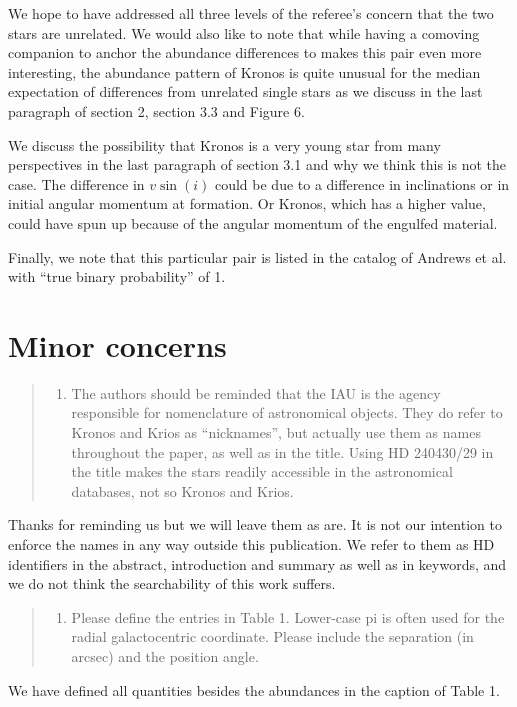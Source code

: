 \documentclass[12pt]{article}
\begin{document}
We hope to have addressed all three levels of the referee's concern that the two
stars are unrelated.
We would also like to note that while having a comoving companion to anchor the
abundance differences to makes this pair even more interesting, the abundance
pattern of Kronos is quite unusual for the median expectation of differences
from unrelated single stars as we discuss in the last paragraph of section 2,
section 3.3 and Figure 6.

We discuss the possibility that Kronos is a very young star from many
perspectives in the last paragraph of section 3.1 and why we think this is not
the case.
The difference in $v\sin(i)$ could be due to a difference in inclinations or 
in initial angular momentum at formation. Or Kronos, which has a higher value,
could have spun up because of the angular momentum of the engulfed material.

Finally, we note that this particular pair is listed in the catalog of Andrews et al.
with ``true binary probability'' of 1.


\section*{Minor concerns}\label{minor-concerns}

\begin{quote}
\begin{enumerate}
\def\labelenumi{\arabic{enumi}.}
\itemsep1pt\parskip0pt
\item
  The authors should be reminded that the IAU is the agency responsible
  for nomenclature of astronomical objects. They do refer to Kronos and
  Krios as ``nicknames'', but actually use them as names throughout the
  paper, as well as in the title. Using HD 240430/29 in the title makes
  the stars readily accessible in the astronomical databases, not so
  Kronos and Krios.
\end{enumerate}
\end{quote}
Thanks for reminding us but we will leave them as are. It is not our intention
to enforce the names in any way outside this publication. We refer to them as HD
identifiers in the abstract, introduction and summary as well as in keywords,
and we do not think the searchability of this work suffers.

\begin{quote}
\begin{enumerate}
\def\labelenumi{\arabic{enumi}.}
\setcounter{enumi}{1}
\itemsep1pt\parskip0pt
\item
  Please define the entries in Table 1. Lower-case pi is often used for
  the radial galactocentric coordinate. Please include the separation
  (in arcsec) and the position angle.
\end{enumerate}
\end{quote}
We have defined all quantities besides the abundances in the caption of Table 1.
\end{document}
